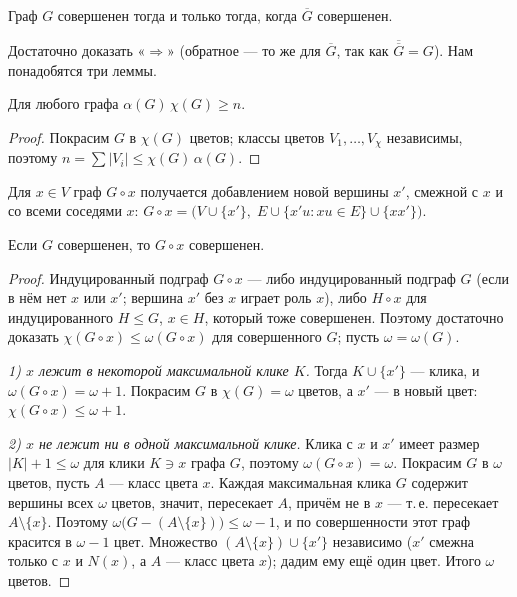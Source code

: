 \begin{theorem}
Граф \(G\) совершенен тогда и только тогда, когда \(\overline G\) совершенен.
\end{theorem}
Достаточно доказать «\(\Rightarrow\)» (обратное — то же для \(\overline G\), так как \(\overline{\overline G}=G\)).
Нам понадобятся три леммы.

\begin{lemma}\label{lem:alphachi}
Для любого графа \(\alpha(G)\,\chi(G)\ge n\).
\end{lemma}
\begin{proof}
Покрасим \(G\) в \(\chi(G)\) цветов; классы цветов \(V_1,\ldots,V_{\chi}\) независимы, поэтому
\(n=\sum|V_i|\le\chi(G)\,\alpha(G)\).
\end{proof}

\begin{definition}
Для \(x\in V\) граф \(G\circ x\) получается добавлением новой вершины \(x'\), смежной с \(x\) и
со всеми соседями \(x\): \(G\circ x=\bigl(V\cup\{x'\},\;E\cup\{x'u: xu\in E\}\cup\{xx'\}\bigr)\).
\end{definition}
\begin{lemma}\label{lem:clone}
Если \(G\) совершенен, то \(G\circ x\) совершенен.
\end{lemma}
\begin{proof}
Индуцированный подграф \(G\circ x\) — либо индуцированный подграф \(G\) (если в нём нет
\(x\) или \(x'\); вершина \(x'\) без \(x\) играет роль \(x\)), либо \(H\circ x\) для индуцированного
\(H\le G\), \(x\in H\), который тоже совершенен. Поэтому достаточно доказать
\(\chi(G\circ x)\le\omega(G\circ x)\) для совершенного \(G\); пусть \(\omega=\omega(G)\).

\emph{1) \(x\) лежит в некоторой максимальной клике \(K\).} Тогда \(K\cup\{x'\}\) — клика, и
\(\omega(G\circ x)=\omega+1\). Покрасим \(G\) в \(\chi(G)=\omega\) цветов, а \(x'\) — в новый цвет:
\(\chi(G\circ x)\le\omega+1\).

\emph{2) \(x\) не лежит ни в одной максимальной клике.} Клика с \(x\) и \(x'\) имеет размер
\(|K|+1\le\omega\) для клики \(K\ni x\) графа \(G\), поэтому \(\omega(G\circ x)=\omega\). Покрасим \(G\) в
\(\omega\) цветов, пусть \(A\) — класс цвета \(x\). Каждая максимальная клика \(G\) содержит
вершины всех \(\omega\) цветов, значит, пересекает \(A\), причём не в \(x\) — т.\,е. пересекает
\(A\setminus\{x\}\). Поэтому \(\omega\bigl(G-(A\setminus\{x\})\bigr)\le\omega-1\), и по совершенности этот граф
красится в \(\omega-1\) цвет. Множество \((A\setminus\{x\})\cup\{x'\}\) независимо (\(x'\) смежна
только с \(x\) и \(N(x)\), а \(A\) — класс цвета \(x\)); дадим ему ещё один цвет. Итого \(\omega\) цветов.
\end{proof}


